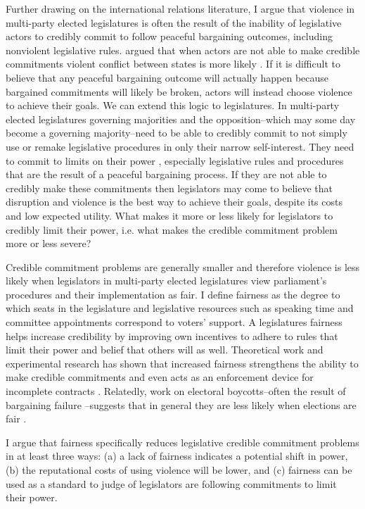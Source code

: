 \documentclass[a4paper]{article}\usepackage[]{graphicx}\usepackage[]{color}
\begin{document}
Further drawing on the international relations literature, I argue that violence in multi-party elected legislatures is often the result of the inability of legislative actors to credibly commit to follow peaceful bargaining outcomes, including nonviolent legislative rules. \cite{Fearon1995} argued that when actors are not able to make credible commitments violent conflict between states is more likely \cite[see also][]{Powell2006}. If it is difficult to believe that any peaceful bargaining outcome will actually happen because bargained commitments will likely be broken, actors will instead choose violence to achieve their goals. We can extend this logic to legislatures. In multi-party elected legislatures governing majorities and the opposition--which may some day become a governing majority--need to be able to credibly commit to not simply use or remake legislative procedures in only their narrow self-interest. They need to commit to limits on their power \citep{riker1982,Gaubatz1996}, especially legislative rules and procedures that are the result of a peaceful bargaining process. If they are not able to credibly make these commitments then legislators may come to believe that disruption and violence is the best way to achieve their goals, despite its costs and low expected utility. What makes it more or less likely for legislators to credibly limit their power, i.e. what makes the credible commitment problem more or less severe? 

Credible commitment problems are generally smaller and therefore violence is less likely when legislators in multi-party elected legislatures view parliament's procedures and their implementation as fair. I define fairness as the degree to which seats in the legislature and legislative resources such as speaking time and committee appointments correspond to voters' support. A legislatures  fairness helps increase credibility by improving own incentives to adhere to rules that limit their power and belief that others will as well. Theoretical work and experimental research has shown that increased fairness strengthens the ability to make credible commitments \citep{Ellingsen2004} and even acts as an enforcement device for incomplete contracts \citep[see][for a review]{Fehr2008}. Relatedly, work on electoral boycotts--often the result of bargaining failure \citep{BeaulieuForthcoming}--suggests that in general they are less likely when elections are fair \citep{Bratton1998,Lindberg2006}. 

I argue that fairness specifically reduces legislative credible commitment problems in at least three ways: (a) a lack of fairness indicates a potential shift in power, (b) the reputational costs of using violence will be lower, and (c) fairness can be used as a standard to judge of legislators are following commitments to limit their power.
\end{document}

